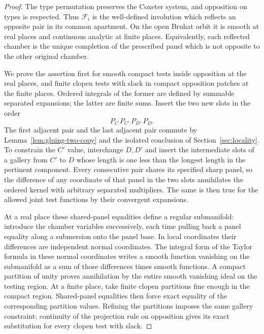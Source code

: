 \begin{proof}
The type permutation preserves the Coxeter system, and
opposition on types is respected.  Thus $\mathcal F_i$
is the well-defined involution which reflects an
opposite pair in its common apartment.  On the open
Bruhat orbit it is smooth at real places and continuous
analytic at finite places.  Equivalently, each reflected
chamber is the unique completion of the prescribed panel
which is not opposite to the other original chamber.

We prove the assertion first for smooth compact tests
inside opposition at the real places, and finite clopen
tests with slack in compact opposition patches at the
finite places.  Ordered integrals of the former are
defined by summable separated expansions; the latter
are finite sums.  Insert the two new slots in the order
\[
 P_C\,P_{C'}\,P_{D'}\,P_D.
\]
The first adjacent pair and the last adjacent pair
commute by Lemma~\ref{lem:gluing-two-copy} and the
isolated conclusion of Section~\ref{sec:locality}.
To constrain the $C'$ value, interchange $D,D'$ and
insert the intermediate slots of a gallery from $C'$
to $D$ whose length is one less than the longest
length in the pertinent component.  Every consecutive
pair shares its specified sharp panel, so the
difference of any coordinate of that panel in the two
slots annihilates the ordered kernel with arbitrary
separated multipliers.  The same is then true for the
allowed joint test functions by their convergent
expansions.

At a real place these shared-panel equalities define
a regular submanifold: introduce the chamber variables
successively, each time pulling back a panel equality
along a submersion onto the panel base.  In local
coordinates their differences are independent normal
coordinates.  The integral form of the Taylor formula
in these normal coordinates writes a smooth function
vanishing on the submanifold as a sum of those
differences times smooth functions.  A compact
partition of unity proves annihilation by the entire
smooth vanishing ideal on the testing region.
At a finite place, take finite clopen partitions fine
enough in the compact region.  Shared-panel equalities
then force exact equality of the corresponding
partition values.  Refining the partitions imposes
the same gallery constraint; continuity of the
projection rule on opposition gives its exact
substitution for every clopen test with slack.


\end{proof}
